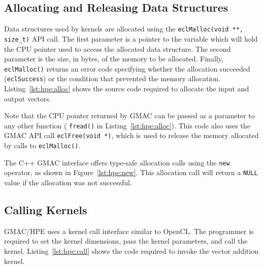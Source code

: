 

\subsection{Allocating and Releasing Data Structures}
Data structures used by kernels are allocated using the \texttt{eclMalloc(void **, size\_t)} API 
call. The first parameter is a pointer to the variable which will hold the CPU pointer used to 
access the allocated data structure. The second parameter is the size, in bytes, of the memory to be 
allocated. Finally, \texttt{eclMalloc()} returns an error code specifying whether the allocation 
succeeded (\texttt{eclSuccess}) or the condition that prevented the memory allocation.  
Listing~\ref{lst:hpe:alloc} shows the source code required to allocate the input and output vectors.  



Note that the CPU pointer returned by GMAC can be passed as a parameter to any other function (\eg 
\texttt{fread()} in Listing~\ref{lst:hpe:alloc}). This code also uses the GMAC API call 
\texttt{eclFree(void *)}, which is used to release the memory allocated by calls to 
\texttt{eclMalloc()}.

The C++ GMAC interface offers type\hyp{}safe allocation calls using the \texttt{new} operator, as 
shown in Figure~\ref{lst:hpe:new}. This allocation call will return a \texttt{NULL} value if the 
allocation was not successful.



\subsection{Calling Kernels}
GMAC\slash HPE uses a kernel call interface similar to OpenCL\@. The programmer is required to set 
the kernel dimensions, pass the kernel parameters, and call the kernel. Listing~\ref{lst:hpe:call} 
shows the code required to invoke the vector addition kernel.



